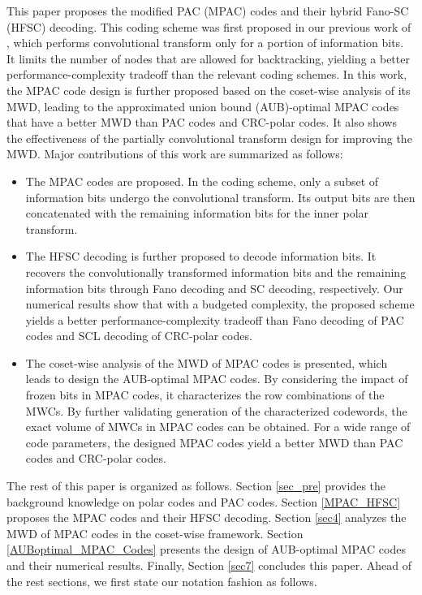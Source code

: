 \documentclass[12pt, draftclsnofoot, peerreview, onecolumn]{IEEEtran}
\theoremstyle{noparent}
\begin{document}
This paper proposes the modified PAC (MPAC) codes and their hybrid Fano-SC (HFSC) decoding. This coding scheme was first proposed in our previous work of \cite{Cai2023ModifiedPACCodes}, which performs convolutional transform only for a portion of information bits. It limits the number of nodes that are allowed for backtracking, yielding a better performance-complexity tradeoff than the relevant coding schemes.
In this work, the MPAC code design is further proposed based on the coset-wise analysis of its MWD, leading to the 
approximated union bound (AUB)-optimal MPAC codes that have a better MWD than PAC codes and CRC-polar codes.
It also shows the effectiveness of the partially convolutional transform design for improving the MWD. 
Major contributions of this work are summarized as follows:
\begin{itemize}
\item The MPAC codes are proposed. 
In the coding scheme, only a subset of information bits undergo the convolutional transform. 
Its output bits are then concatenated with the remaining information bits for the inner polar transform.
\item The HFSC decoding is further proposed to decode information bits. It recovers the convolutionally transformed information bits and the remaining information bits through Fano decoding and SC decoding, respectively. 
Our numerical results show that with a budgeted complexity, the proposed scheme yields a better performance-complexity tradeoff than Fano decoding of PAC codes and SCL decoding of CRC-polar codes.
\item The coset-wise analysis of the MWD of MPAC codes is presented, 
which leads to design the AUB-optimal MPAC codes.
By considering the impact of frozen bits in MPAC codes, 
it characterizes the row combinations of the MWCs. 
By further validating generation of the characterized codewords,
the exact volume of MWCs in MPAC codes can be obtained. 
For a wide range of code parameters,
the designed MPAC codes yield a better MWD than PAC codes and CRC-polar codes.
\end{itemize}




The rest of this paper is organized as follows. 
Section \ref{sec_pre} provides the background knowledge on polar codes and PAC codes.  
Section \ref{MPAC_HFSC} proposes the MPAC codes and their HFSC decoding.
Section \ref{sec4} analyzes the MWD of MPAC codes in the coset-wise framework.
Section \ref{AUBoptimal_MPAC_Codes} presents the design of AUB-optimal MPAC codes and their numerical results.
Finally, Section \ref{sec7} concludes this paper. 
Ahead of the rest sections, we first state our notation fashion as follows.
\end{document}
